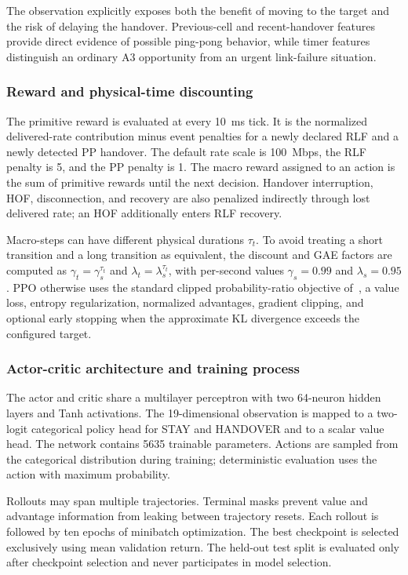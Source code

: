 The observation explicitly exposes both the benefit of moving to the target
and the risk of delaying the handover. Previous-cell and recent-handover
features provide direct evidence of possible ping-pong behavior, while timer
features distinguish an ordinary A3 opportunity from an urgent link-failure
situation.

\subsubsection{Reward and physical-time discounting}

The primitive reward is evaluated at every 10~ms tick. It is the normalized
delivered-rate contribution minus event penalties for a newly declared RLF
and a newly detected PP handover. The default rate scale is 100~Mbps, the RLF
penalty is 5, and the PP penalty is 1. The macro reward assigned to an action
is the sum of primitive rewards until the next decision. Handover interruption,
HOF, disconnection, and recovery are also penalized indirectly through lost
delivered rate; an HOF additionally enters RLF recovery.

Macro-steps can have different physical durations $\tau_t$. To avoid treating
a short transition and a long transition as equivalent, the discount and GAE
factors are computed as $\gamma_t=\gamma_s^{\tau_t}$ and
$\lambda_t=\lambda_s^{\tau_t}$, with per-second values
$\gamma_s=0.99$ and $\lambda_s=0.95$. PPO otherwise uses the standard clipped
probability-ratio objective of~\cite{schulman2017ppo}, a value loss, entropy
regularization, normalized advantages, gradient clipping, and optional early
stopping when the approximate KL divergence exceeds the configured target.

\subsubsection{Actor-critic architecture and training process}

The actor and critic share a multilayer perceptron with two 64-neuron hidden
layers and Tanh activations. The 19-dimensional observation is mapped to a
two-logit categorical policy head for STAY and HANDOVER and to a scalar value
head. The network contains 5635 trainable parameters. Actions are sampled from
the categorical distribution during training; deterministic evaluation uses
the action with maximum probability.

Rollouts may span multiple trajectories. Terminal masks prevent value and
advantage information from leaking between trajectory resets. Each rollout is
followed by ten epochs of minibatch optimization. The best checkpoint is
selected exclusively using mean validation return. The held-out test split is
evaluated only after checkpoint selection and never participates in model
selection.

